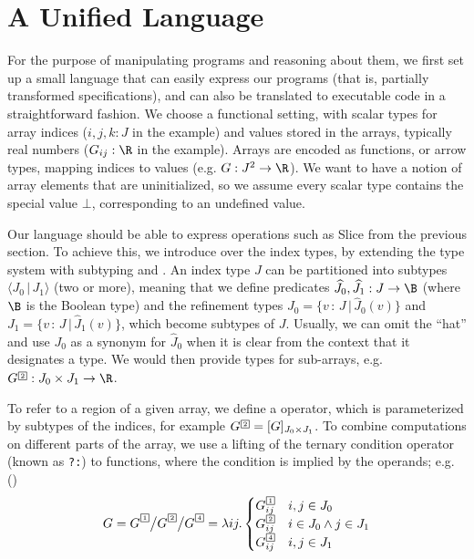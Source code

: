 \section{A Unified Language}
\label{lang}

\newcommand\semp[1]{[\![{#1}]\!]}
\newcommand\fix{\operatorname{fix}}

For the purpose of manipulating programs and reasoning about them,
we first set up a small language that can easily express our programs (that is,
partially transformed specifications), and can also be translated to executable
code in a straightforward fashion. We choose a functional
setting, with scalar types for array indices ($i, j, k : J$ in the example)
and values stored in the arrays, typically real numbers ($G_{ij} : \R$ in the example).
Arrays are encoded as functions, or arrow types, mapping indices
to values (e.g. $G : J^2\to\R$). We want to have a notion of
array elements that are uninitialized, so we assume every scalar type
contains the special value $\bot$, corresponding to an undefined value.

Our language should be able to express operations such as \textsf{Slice}
from the previous section. To achieve this, we introduce 
 over the index types, by extending the
type system with subtyping and . An index
type $J$ can be partitioned into subtypes $\langle J_0 \,|\, J_1\rangle$
(two or more), meaning that we define predicates $\widehat{J}_0,\widehat{J}_1 : J\to\B$ (where $\B$ is the Boolean type)
and the refinement types $J_0=\{v\,{:}\,J \,|\, \widehat{J}_0(v)\}$
and $J_1=\{v\,{:}\,J \,|\, \widehat{J}_1(v)\}$, which become subtypes of $J$.
Usually, we can omit the ``hat'' and use $J_0$ as a synonym for $\widehat{J}_0$ 
when it is clear from the context that it designates a type. 
We would then provide types for sub-arrays, e.g. 
$G^{\raisebox{-2pt}{\tinyqbox{2}}} : J_0\times J_1 \to \R$.

To refer to a region of a given array, we define a 
operator, which is parameterized by subtypes of the indices,
for example $G^{\raisebox{-2pt}{\tinyqbox{2}}} = [G]_{J_0\times J_1}$.
To combine computations on different parts of the array, we use a lifting
of the ternary condition operator (known as {\tt ?:}) to functions,
where the condition is implied by the operands; e.g.
()
\[
G=G^{\tinyqbox1} \big/ G^{\tinyqbox2} \big/ G^{\tinyqbox4} = 
\lambda ij.
\begin{cases}
  G^{\tinyqbox1}_{ij} & i,j\in J_0 \\
  G^{\tinyqbox2}_{ij} & i\in J_0 \land j\in J_1 \\
  G^{\tinyqbox4}_{ij} & i,j\in J_1 \\
\end{cases}
\]

